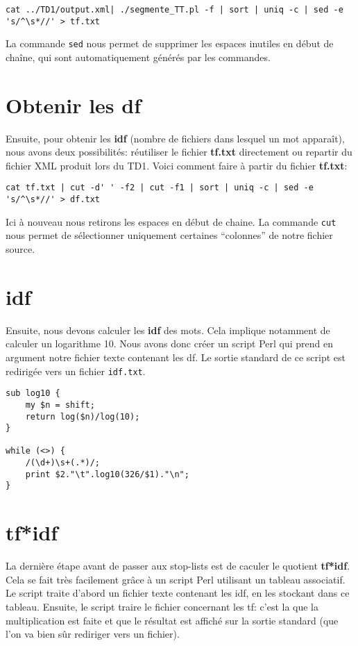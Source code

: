 \begin{lstlisting}
cat ../TD1/output.xml| ./segmente_TT.pl -f | sort | uniq -c | sed -e 's/^\s*//' > tf.txt
\end{lstlisting}

La commande \lstinline{sed} nous permet de supprimer les espaces inutiles en début de chaîne, qui sont automatiquement générés par les commandes.

\section{Obtenir les df}

Ensuite, pour obtenir les \textbf{idf} (nombre de fichiers dans lesquel un mot apparaît), nous avons deux possibilités: réutiliser le fichier \textbf{tf.txt} directement ou repartir du fichier XML produit lors du TD1. Voici comment faire à partir du fichier \textbf{tf.txt}:

\begin{lstlisting}
cat tf.txt | cut -d' ' -f2 | cut -f1 | sort | uniq -c | sed -e 's/^\s*//' > df.txt
\end{lstlisting}

Ici à nouveau nous retirons les espaces en début de chaine. La commande \lstinline{cut} nous permet de sélectionner uniquement certaines ``colonnes'' de notre fichier source.

\section{idf}

Ensuite, nous devons calculer les \textbf{idf} des mots. Cela implique notamment de calculer un logarithme 10. Nous avons donc créer un script Perl qui prend en argument notre fichier texte contenant les df. Le sortie standard de ce script est redirigée vers un fichier \lstinline{idf.txt}.

\perl
\begin{lstlisting}
sub log10 {
    my $n = shift;
    return log($n)/log(10);
}

while (<>) {
    /(\d+)\s+(.*)/;
    print $2."\t".log10(326/$1)."\n";
}
\end{lstlisting}

\section{tf*idf}

La dernière étape avant de passer aux stop-lists est de caculer le quotient \textbf{tf*idf}. Cela se fait très facilement grâce à un script Perl utilisant un tableau associatif. Le script traite d'abord un fichier texte contenant les idf, en les stockant dans ce tableau. Ensuite, le script traire le fichier concernant les tf: c'est la que la multiplication est faite et que le résultat est affiché sur la sortie standard (que l'on va bien sûr rediriger vers un fichier).

